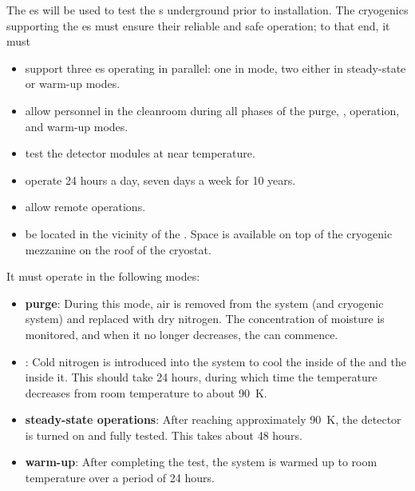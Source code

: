 \label{sec:fdsp-tc-cryocoldbox}

The  \coldbox{}es will be used to test the s underground prior to installation. %
The cryogenics supporting the \coldbox{}es  must ensure their reliable and safe operation; to that end, it must
\begin{itemize}
\setlength\itemsep{1mm}
\setlength{\parsep}{1mm}
\setlength{\itemsep}{-5mm}
\item support three \coldbox{}es operating in parallel: %
one in \cooldown mode, two either in steady-state or warm-up modes.
\item allow personnel in the cleanroom during all phases of the purge, \cooldown, operation, and warm-up modes. 
\item test the detector modules at near  temperature.
\item operate 24 hours a day, seven days a week for 10 years.
\item allow remote operations.
\item be located in the vicinity of the . Space is available on top of the cryogenic mezzanine on the roof of the cryostat.
\end{itemize}

It must operate in the following modes: %

\begin{itemize}
\setlength\itemsep{1mm}
\setlength{\parsep}{1mm}
\setlength{\itemsep}{-5mm}
\item \textbf{purge}: During this mode, air is removed from the system (\coldbox and cryogenic system) and replaced with dry nitrogen. The concentration of moisture is monitored, and when it no longer decreases, the \cooldown can commence.
\item \textbf{\cooldown}: Cold nitrogen is introduced into the system to cool the inside of the \coldbox and the  inside it. %
This should take 24 hours, during which time the temperature decreases from room temperature to about \SI{90}{K}. 
\item \textbf{steady-state operations}: After reaching %
approximately \SI{90}{K}, %
the detector is turned on and fully tested. %
This takes about 48 hours.
\item \textbf{warm-up}: After completing the test, the system is %
warmed up to room temperature over a period of 24 hours. %
\end{itemize}

